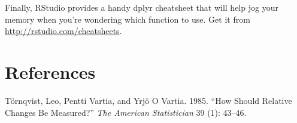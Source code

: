 Finally, RStudio provides a handy dplyr cheatsheet that will help jog
your memory when you're wondering which function to use. Get it from
\url{http://rstudio.com/cheatsheets}.

\section*{References}

Törnqvist, Leo, Pentti Vartia, and Yrjö O Vartia. 1985. ``How Should
Relative Changes Be Measured?'' \emph{The American Statistician} 39 (1):
43--46.
